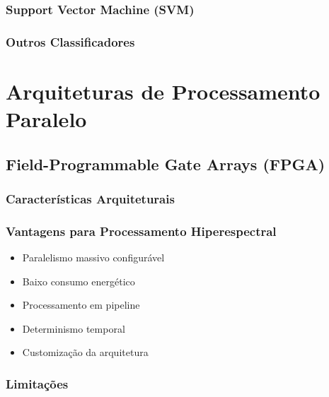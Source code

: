 \subsubsection{Support Vector Machine (SVM)}

\subsubsection{Outros Classificadores}

\section{Arquiteturas de Processamento Paralelo}\label{sec:arquiteturas}

\subsection{Field-Programmable Gate Arrays (FPGA)}\label{subsec:fpga}
\subsubsection{Características Arquiteturais}

\subsubsection{Vantagens para Processamento Hiperespectral}
\begin{itemize}
    \item Paralelismo massivo configurável
    \item Baixo consumo energético
    \item Processamento em pipeline
    \item Determinismo temporal
    \item Customização da arquitetura
\end{itemize}

\subsubsection{Limitações}

